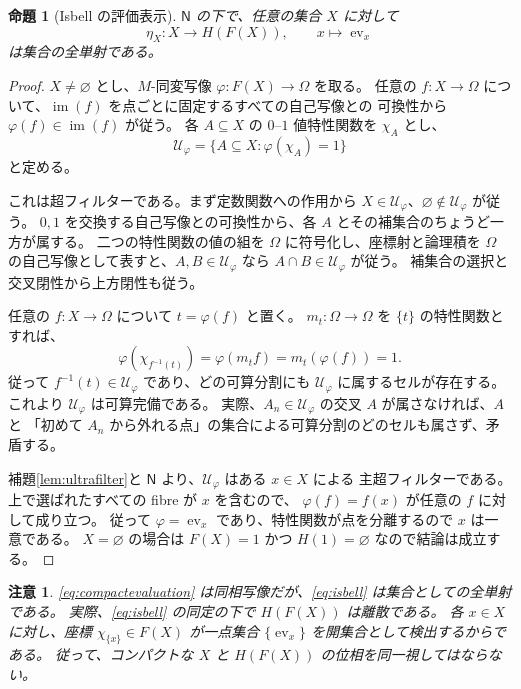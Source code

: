 \documentclass[a4paper,11pt]{ltjsarticle}
\theoremstyle{japaneseplain}
\newtheorem{proposition}[theorem]{命題}
\newtheorem{remark}[theorem]{注意}
\newcommand{\Naxiom}{\mathsf N}
\newcommand{\ev}{\operatorname{ev}}
\newcommand{\im}{\operatorname{im}}
\begin{document}
\begin{proposition}[Isbell の評価表示]\label{prop:isbell}
$\Naxiom$ の下で、任意の集合 $X$ に対して
\begin{equation}\label{eq:isbell}
 \eta_X:X\longrightarrow H(F(X)),\qquad x\longmapsto\ev_x
\end{equation}
は集合の全単射である。
\end{proposition}
\begin{proof}
$X\ne\varnothing$ とし、$M$-同変写像 $\varphi:F(X)\to\Omega$ を取る。
任意の $f:X\to\Omega$ について、$\im(f)$ を点ごとに固定するすべての自己写像との
可換性から $\varphi(f)\in\im(f)$ が従う。
各 $A\subseteq X$ の $0$--$1$ 値特性関数を $\chi_A$ とし、
\[
 \mathscr U_\varphi
 =\{A\subseteq X:\varphi(\chi_A)=1\}
\]
と定める。

これは超フィルターである。まず定数関数への作用から
$X\in\mathscr U_\varphi$、$\varnothing\notin\mathscr U_\varphi$ が従う。
$0,1$ を交換する自己写像との可換性から、各 $A$ とその補集合のちょうど一方が属する。
二つの特性関数の値の組を $\Omega$ に符号化し、座標射と論理積を
$\Omega$ の自己写像として表すと、$A,B\in\mathscr U_\varphi$ なら
$A\cap B\in\mathscr U_\varphi$ が従う。
補集合の選択と交叉閉性から上方閉性も従う。

任意の $f:X\to\Omega$ について $t=\varphi(f)$ と置く。
$m_t:\Omega\to\Omega$ を $\{t\}$ の特性関数とすれば、
\[
 \varphi(\chi_{f^{-1}(t)})
 =\varphi(m_t f)=m_t(\varphi(f))=1.
\]
従って $f^{-1}(t)\in\mathscr U_\varphi$ であり、どの可算分割にも
$\mathscr U_\varphi$ に属するセルが存在する。
これより $\mathscr U_\varphi$ は可算完備である。
実際、$A_n\in\mathscr U_\varphi$ の交叉 $A$ が属さなければ、$A$ と
「初めて $A_n$ から外れる点」の集合による可算分割のどのセルも属さず、矛盾する。

補題\ref{lem:ultrafilter}と $\Naxiom$ より、$\mathscr U_\varphi$ はある $x\in X$ による
主超フィルターである。上で選ばれたすべての fibre が $x$ を含むので、
$\varphi(f)=f(x)$ が任意の $f$ に対して成り立つ。
従って $\varphi=\ev_x$ であり、特性関数が点を分離するので $x$ は一意である。
$X=\varnothing$ の場合は $F(X)=1$ かつ $H(1)=\varnothing$ なので結論は成立する。
\end{proof}

\begin{remark}\label{rem:topology}
\eqref{eq:compactevaluation} は同相写像だが、\eqref{eq:isbell} は集合としての全単射である。
実際、\eqref{eq:isbell} の同定の下で $H(F(X))$ は離散である。
各 $x\in X$ に対し、座標 $\chi_{\{x\}}\in F(X)$ が一点集合 $\{\ev_x\}$ を開集合として検出するからである。
従って、コンパクトな $X$ と $H(F(X))$ の位相を同一視してはならない。
\end{remark}
\end{document}
